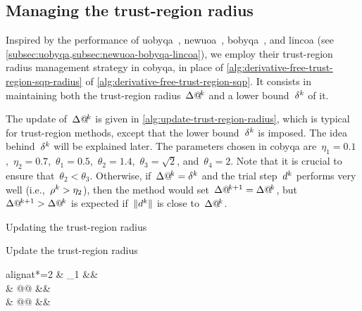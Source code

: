 \subsection{Managing the trust-region radius}
\label{subsec:managing-trust-region-radius}

Inspired by the performance of \gls{uobyqa}~\cite{Powell_2002}, \gls{newuoa}~\cite{Powell_2006}, \gls{bobyqa}~\cite{Powell_2009}, and \gls{lincoa} (see \cref{subsec:uobyqa,subsec:newuoa-bobyqa-lincoa}), we employ their trust-region radius management strategy in \gls{cobyqa}, in place of \cref{alg:derivative-free-trust-region-sqp-radius} of \cref{alg:derivative-free-trust-region-sqp}.
It consists in maintaining both the trust-region radius~$\rad[k]$ and a lower bound~$\radlb[k]$ of it.

The update of~$\rad[k]$ is given in \cref{alg:update-trust-region-radius}, which is typical for trust-region methods, except that the lower bound~$\radlb[k]$ is imposed.
The idea behind~$\radlb[k]$ will be explained later.
The parameters chosen in \gls{cobyqa} are~$\eta_1 = 0.1$,~$\eta_2 = 0.7$,~$\theta_1 = 0.5$,~$\theta_2 = 1.4$,~$\theta_3 = \sqrt{2}$, and~$\theta_4 = 2$.
Note that it is crucial to ensure that~$\theta_2 < \theta_3$.
Otherwise, if~$\rad[k] = \radlb[k]$ and the trial step~$\step[k]$ performs very well (i.e.,~$\ratio[k] > \eta_2$), then the method would set~$\rad[k + 1] = \rad[k]$, but~$\rad[k + 1] > \rad[k]$ is expected if~$\norm{\step[k]}$ is close to~$\rad[k]$.

\begin{algorithm}
    \caption{Updating the trust-region radius}
    \label{alg:update-trust-region-radius}
    \DontPrintSemicolon
    \onehalfspacing
    Update the trust-region radius
    \begin{algoempheq}[left={\rad[k + 1] \gets \empheqlbrace}]{alignat*=2}
        & \theta_1 \rad[k]                                                                      && \quad {}\\
        & \max @@ \set{\theta_1 \rad[k], \norm{\step[k]}}                                          && \quad {}\\
        & \min @@     && \quad {}
    \end{algoempheq}
    \If{$\rad[k + 1] \le \theta_2 \radlb[k]$}{
        $\rad[k + 1] \gets \radlb[k]$\;
    }
\end{algorithm}


